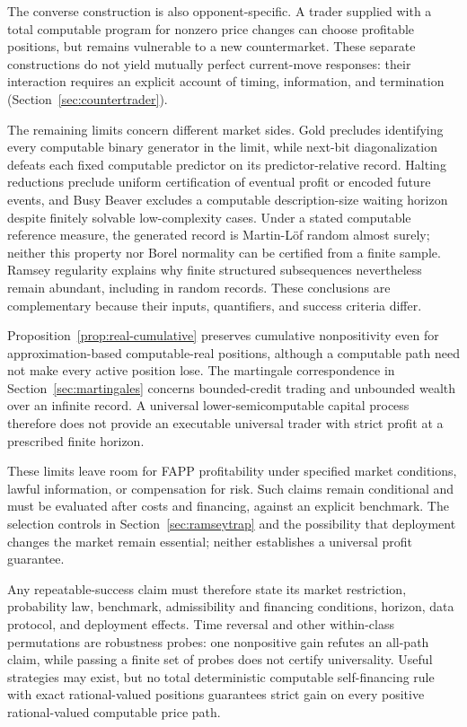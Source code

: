 \documentclass[aps,pra,reprint,superscriptaddress,amsmath,amssymb,floatfix]{revtex4-2}
\theoremstyle{plain}
\theoremstyle{definition}
\theoremstyle{remark}
\begin{document}
The converse construction is also opponent-specific. A trader supplied
with a total computable program for nonzero price changes can choose
profitable positions, but remains vulnerable to a new countermarket.
These separate constructions do not yield mutually perfect current-move
responses: their interaction requires an explicit account of timing,
information, and termination (Section~\ref{sec:countertrader}).

The remaining limits concern different market sides. Gold precludes identifying
every computable binary generator in the limit, while next-bit diagonalization
defeats each fixed computable predictor on its predictor-relative record.
Halting reductions preclude uniform certification of eventual profit or encoded
future events, and Busy Beaver excludes a computable description-size waiting
horizon despite finitely solvable low-complexity cases. Under a stated
computable reference measure, the generated record is Martin-L\"of random
almost surely; neither this property nor Borel normality can be certified
from a finite sample. Ramsey regularity explains why finite
structured subsequences nevertheless remain abundant, including in random
records. These conclusions are complementary because their inputs,
quantifiers, and success criteria differ.

Proposition~\ref{prop:real-cumulative} preserves cumulative nonpositivity
even for approximation-based computable-real positions, although a computable
path need not make every active position lose. The martingale correspondence
in Section~\ref{sec:martingales} concerns bounded-credit trading and
unbounded wealth over an infinite record. A universal lower-semicomputable
capital process therefore does not provide an executable universal trader
with strict profit at a prescribed finite horizon.

These limits leave room for FAPP profitability under specified market
conditions, lawful information, or compensation for risk. Such claims remain
conditional and must be evaluated after costs and financing, against an
explicit benchmark. The selection controls in Section~\ref{sec:ramseytrap}
and the possibility that deployment changes the market remain essential;
neither establishes a universal profit guarantee.

Any repeatable-success claim must therefore state its market restriction,
probability law, benchmark, admissibility and financing conditions, horizon,
data protocol, and deployment effects. Time reversal and other within-class
permutations are robustness probes: one nonpositive gain refutes an all-path
claim, while passing a finite set of probes does not certify universality.
Useful strategies may exist, but no total deterministic computable
self-financing rule with exact rational-valued positions guarantees strict
gain on every positive rational-valued computable price path.
\end{document}
